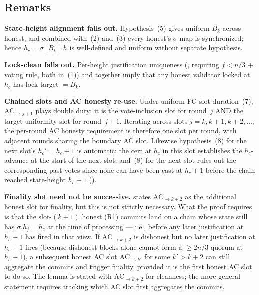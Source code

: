 \ifx\litemode\undefined\documentclass{article}\fi
\renewcommand{\paragraph}[1]{\vspace{7pt}\noindent\textbf{#1}}
\theoremstyle{plain}
\theoremstyle{definition}
\theoremstyle{remark}
\begin{document}
\subsection{Remarks}\label{rev:subsec:per-round-remarks}

\paragraph{State-height alignment falls out.} Hypothesis~(5) gives uniform $B_k$ across honest, and combined with~(2) and~(3) every honest's $\sigma$ map is synchronized; hence $h_c = \sigma[B_k].h$ is well-defined and uniform without separate hypothesis.

\paragraph{Lock-clean falls out.} Per-height justification uniqueness (, requiring $f < n/3$ + voting rule, both in~(1)) and  together imply that any honest validator locked at $h_c$ has lock-target $= B_k$.

\paragraph{Chained slots and AC honesty re-use.} Under uniform FG slot duration~(7), $\mathrm{AC}_{\to j+1}$ plays double duty: it is the vote-inclusion slot for round~$j$ AND the target-uniformity slot for round~$j+1$. Iterating across slots $j = k, k+1, k+2, \ldots$, the per-round AC honesty requirement is therefore one slot per round, with adjacent rounds sharing the boundary AC slot. Likewise hypothesis~(8) for the next slot's $h_c' = h_c + 1$ is automatic: the cert at $h_c$ in this slot establishes the $h_c$-advance at the start of the next slot, and~(8) for the next slot rules out the corresponding past votes since none can have been cast at $h_c + 1$ before the chain reached state-height $h_c + 1$ ().

\paragraph{Finality slot need not be successive.}  states $\mathrm{AC}_{\to k+2}$ as the additional honest slot for finality, but this is not strictly necessary. What the proof requires is that the slot-$(k+1)$ honest \mbox{(R1)} commits land on a chain whose state still has $\sigma.h_j = h_c$ at the time of processing --- i.e., before any later justification at $h_c + 1$ has fired in that view. If $\mathrm{AC}_{\to k+2}$ is dishonest but no later justification at $h_c + 1$ fires (because dishonest blocks alone cannot form a $\geq 2n/3$ quorum at $h_c + 1$), a subsequent honest AC slot $\mathrm{AC}_{\to k'}$ for some $k' > k+2$ can still aggregate the commits and trigger finality, provided it is the first honest AC slot to do so. The lemma is stated with $\mathrm{AC}_{\to k+2}$ for cleanness; the more general statement requires tracking which AC slot first aggregates the commits.
\end{document}
